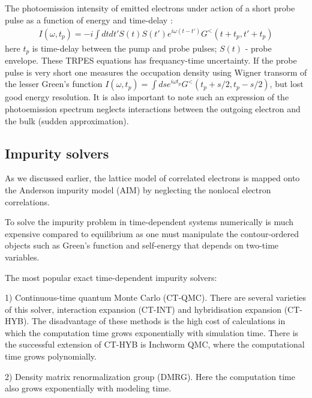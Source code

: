 The photoemission intensity of emitted electrons under action of a short probe pulse as a function of energy and time-delay \citep{PhysRevB.95.115132}:
\begin{align}
\label{PES}
I(\omega,t_p)=-i\int dtdt'S(t)S(t')e^{i\omega(t-t')}G^{<}(t+t_p,t'+t_p)
\end{align}
here $t_p$ is time-delay between the pump and probe pulses; $S(t)$ - probe envelope. 
These TRPES equations has frequancy-time uncertainty. If the probe pulse is very short one measures the occupation density using Wigner transorm of the lesser Green's function $I(\omega,t_p)=\int ds e^{i\omega t_p} G^< (t_p+s/2,t_p-s/2)$, but lost good energy resolution.
It is also important to note such an expression of the photoemission spectrum neglects interactions between the outgoing electron and the bulk (sudden approximation).


\FloatBarrier
\subsection{Impurity solvers}
\label{subsection:Impurity_solvers}
As we discussed earlier, the lattice model of correlated electrons is mapped onto the Anderson impurity model (AIM) by neglecting the nonlocal electron correlations.

To solve the impurity problem in time-dependent systems numerically is much expensive compared to equilibrium as one must manipulate the contour-ordered objects such as Green's function and self-energy that depends on two-time variables. 

The most popular exact time-dependent impurity solvers:

1) Continuous-time quantum Monte Carlo (CT-QMC)\citep{RevModPhys.83.349,PhysRevLett.100.176403,PhysRevB.79.035320,PhysRevLett.106.236401}. There are several varieties of this solver, interaction expansion (CT-INT)\citep{PhysRevB.81.035108,PhysRevB.72.035122,Gull_2008,PhysRevB.79.035320} and hybridisation expansion (CT-HYB)\citep{PhysRevLett.100.176403,PhysRevB.79.153302,PhysRevB.79.035320}. The disadvantage of these methods is the high cost of calculations in which the computation time grows exponentially with simulation time. There is the successful extension of CT-HYB is Inchworm QMC\citep{PhysRevLett.115.266802,PhysRevB.95.085144,PhysRevB.96.155126}, where the computational time grows polynomially.

2) Density matrix renormalization group (DMRG)\citep{RevModPhys.77.259, PhysRevB.95.165139, PhysRevLett.93.040502, PhysRevLett.93.076401}. Here the computation time also grows exponentially with modeling time.

